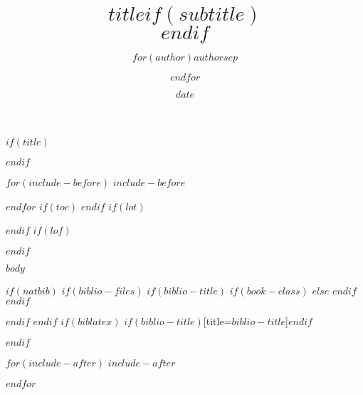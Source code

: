 \documentclass[$if(fontsize)$$fontsize$,$endif$$if(lang)$$lang$,$endif$$if(papersize)$$papersize$,$endif$$for(classoption)$$classoption$$sep$,$endfor$]{$documentclass$}
\title{$title$$if(subtitle)$\\\vspace{0.5em}{\large $subtitle$}$endif$}
\author{$for(author)$$author$$sep$ \and $endfor$}
\date{$date$}
\begin{document}


$if(title)$
\maketitle
$endif$


$for(include-before)$
$include-before$

$endfor$
$if(toc)$
{
\hypersetup{linkcolor=black}
\setcounter{tocdepth}{$toc-depth$}
\tableofcontents
}
$endif$
$if(lot)$
\listoftables
$endif$
$if(lof)$
\listoffigures
$endif$

$body$

$if(natbib)$
$if(biblio-files)$
$if(biblio-title)$
$if(book-class)$
\renewcommand\bibname{$biblio-title$}
$else$
\renewcommand\refname{$biblio-title$}
$endif$
$endif$


$endif$
$endif$
$if(biblatex)$
\printbibliography$if(biblio-title)$[title=$biblio-title$]$endif$

$endif$

$for(include-after)$
$include-after$

$endfor$


\end{document}
